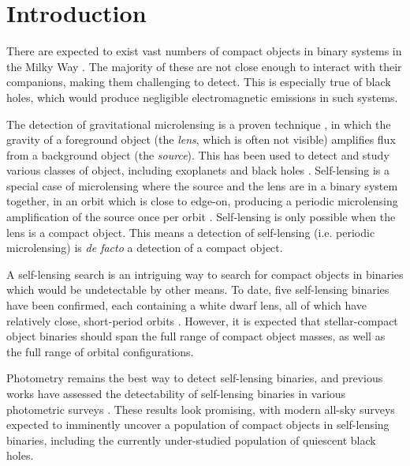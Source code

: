 \documentclass[fleqn,usenatbib]{mnras}
\begin{document}


\section{Introduction}
There are expected to exist vast numbers of compact objects in binary systems in the Milky Way \citep[e.g.][]{shao_population_2019,wiktorowicz_noninteracting_2020,weller_mapping_2023}. The majority of these are not close enough to interact with their companions, making them challenging to detect. This is especially true of black holes, which would produce negligible electromagnetic emissions in such systems.

The detection of gravitational microlensing is a proven technique \citep{paczynski_gravitational_1986,paczynski_gravitational_1996,mao_astrophysical_2012}, in which the gravity of a foreground object (the \textit{lens}, which is often not visible) amplifies flux from a background object (the \textit{source}). This has been used to detect and study various classes of object, including exoplanets \citep{bond_ogle_2004,gaudi_microlensing_2012} and black holes \citep{sahu_isolated_2022,lam_isolated_2022}. Self-lensing is a special case of microlensing where the source and the lens are in a binary system together, in an orbit which is close to edge-on, producing a periodic microlensing amplification of the source once per orbit \citep{maeder_light_1973,agol_occultation_2002}. Self-lensing is only possible when the lens is a compact object. This means a detection of self-lensing (i.e. periodic microlensing) is \textit{de facto} a detection of a compact object.

A self-lensing search is an intriguing way to search for compact objects in binaries which would be undetectable by other means. To date, five self-lensing binaries have been confirmed, each containing a white dwarf lens, all of which have relatively close, short-period orbits \citep{kruse_koi-3278_2014,kawahara_discovery_2018,masuda_self-lensing_2019}. However, it is expected that stellar-compact object binaries should span the full range of compact object masses, as well as the full range of orbital configurations.

Photometry remains the best way to detect self-lensing binaries, and previous works have assessed the detectability of self-lensing binaries in various photometric surveys \citep{wiktorowicz_predicting_2021}. These results look promising, with modern all-sky surveys expected to imminently uncover a population of compact objects in self-lensing binaries, including the currently under-studied population of quiescent black holes.
\end{document}
